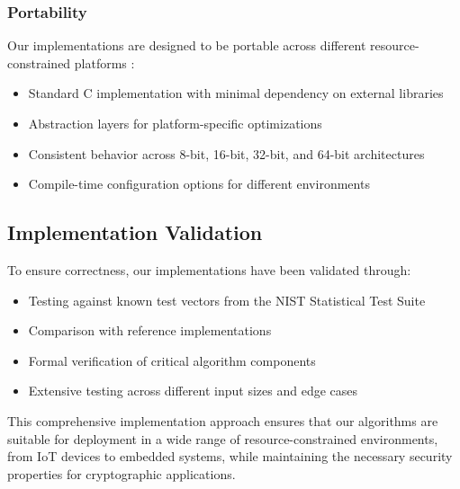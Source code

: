 \subsubsection{Portability}
Our implementations are designed to be portable across different resource-constrained platforms \cite{embedded_benchmarking}:
\begin{itemize}
    \item Standard C implementation with minimal dependency on external libraries
    \item Abstraction layers for platform-specific optimizations
    \item Consistent behavior across 8-bit, 16-bit, 32-bit, and 64-bit architectures
    \item Compile-time configuration options for different environments
\end{itemize}

\subsection{Implementation Validation}
To ensure correctness, our implementations have been validated through:
\begin{itemize}
    \item Testing against known test vectors from the NIST Statistical Test Suite \cite{nist_test_suite}
    \item Comparison with reference implementations
    \item Formal verification of critical algorithm components
    \item Extensive testing across different input sizes and edge cases
\end{itemize}

This comprehensive implementation approach ensures that our algorithms are suitable for deployment in a wide range of resource-constrained environments, from IoT devices to embedded systems, while maintaining the necessary security properties for cryptographic applications. 